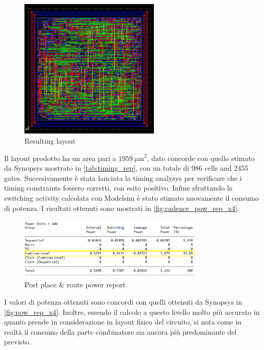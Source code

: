 \begin{figure}[h]
	\center
	\includegraphics[width=0.6\textwidth]{images/IIR_filter_period_min_x4_place.jpg}
	\caption{Resulting layout}
	\label{fig:layout}
\end{figure}

Il layout prodotto ha un area pari a $\SI{1959}{\micro\meter}^2$, dato concorde con quello stimato da Synopsys mostrato in \autoref{tab:timing_rep}, con un totale di 986 cells and 2455 gates. Succesivamente è stata lanciata la timing analysys per verificare che i timing constraints fossero corretti, con esito positivo. Infine sfruttando la switching activity calcolata con Modelsim è stato stimato nuovamente il consumo di potenza. I risultati ottenuti sono mostrati in \autoref{fig:cadence_pow_rep_x4}.

\begin{figure}[h]
	\center
	\includegraphics[width=0.8\textwidth]{images/rep_power_x4_cadence_mod.png}
	\caption{Post place \& route power report}
	\label{fig:cadence_pow_rep_x4}
\end{figure}

I valori di potenza ottenuti sono concordi con quelli ottenuti da Synopsys in \autoref{fig:pow_rep_x4}. Inoltre, essendo il calcolo a questo livello molto più accurato in quanto prende in considerazione in layout fisico del circuito, si nota come in realtà il consumo della parte combinatore sia ancora più predominante del previsto.
